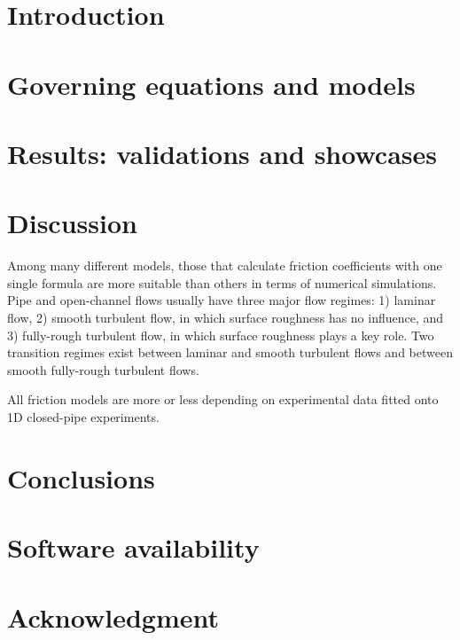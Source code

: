 \documentclass{cas-dc} %
\numberwithin{equation}{section}
\begin{document}

\maketitle

\section{Introduction} \label{sec:introduction}
    

\section{Governing equations and models} \label{sec:methods}
    
    
    
    
    
    

\section{Results: validations and showcases} \label{sec:results}
    

\section{Discussion} \label{sec:discussion}

Among many different models, those that calculate friction coefficients with one single formula are more suitable than others in terms of numerical simulations.
Pipe and open-channel flows usually have three major flow regimes: 1) laminar flow, 2) smooth turbulent flow, in which surface roughness has no influence, and 3) fully-rough turbulent flow, in which surface roughness plays a key role.
Two transition regimes exist between laminar and smooth turbulent flows and between smooth fully-rough turbulent flows.

All friction models are more or less depending on experimental data fitted onto 1D closed-pipe experiments.

\section{Conclusions} \label{sec:conclusion}

\section*{Software availability}

\section*{Acknowledgment}


\sloppy %
\printbibliography
\fussy %

%
%
\end{document}
